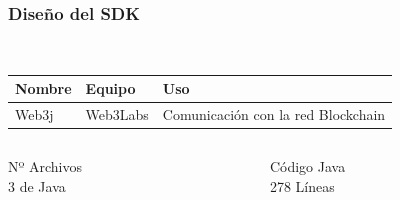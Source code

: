 \documentclass[usenames,dvipsnames]{beamer}
\begin{document}
\begin{frame} 
\frametitle{Diseño del SDK} 
  \begin{center}
     \\
    \vspace{0.5cm}
    \begin{tabular}{|l|l|m{14em}|}
      \hline
      \textbf{\textcolor{UniGold}{Nombre}} & 
      \textbf{\textcolor{UniGold}{Equipo}} & 
      \textbf{\textcolor{UniGold}{Uso}} \\
      \hline
      Web3j & Web3Labs & Comunicación con la red Blockchain\\
      \hline
    \end{tabular}
  \end{center}

  \vspace{-0.5cm}

  \begin{columns}
  \begin{column}{0.5\textwidth}
    \begin{center}
      \textcolor{UniGold}{Nº Archivos} \\
      3 de Java
    \end{center}
  \end{column}
  \begin{column}{0.5\textwidth}
    \begin{center}
      \textcolor{UniGold}{Código Java} \\
      278 Líneas
    \end{center}
  \end{column}
  \end{columns}
\end{frame}
\end{document}

